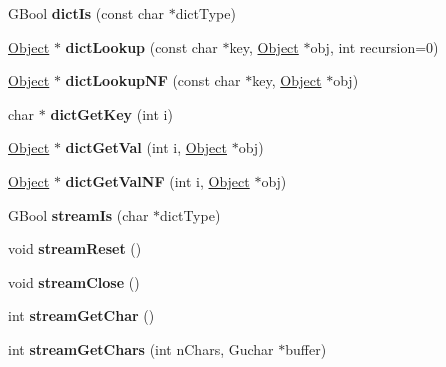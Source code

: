 \begin{DoxyCompactItemize}
G\+Bool {\bfseries dict\+Is} (const char $\ast$dict\+Type)
\item 
\mbox{\label{class_object_a0c5dc48b25274f878f384d1f009abd1d}} 
\hyperlink{class_object}{Object} $\ast$ {\bfseries dict\+Lookup} (const char $\ast$key, \hyperlink{class_object}{Object} $\ast$obj, int recursion=0)
\item 
\mbox{\label{class_object_adf819ae9b1ec29d9afbb25d9c6030c60}} 
\hyperlink{class_object}{Object} $\ast$ {\bfseries dict\+Lookup\+NF} (const char $\ast$key, \hyperlink{class_object}{Object} $\ast$obj)
\item 
\mbox{\label{class_object_ade6d8bea7f84f24589b9a2daa58199aa}} 
char $\ast$ {\bfseries dict\+Get\+Key} (int i)
\item 
\mbox{\label{class_object_aeae2062447decff3e0fb8b5daed06432}} 
\hyperlink{class_object}{Object} $\ast$ {\bfseries dict\+Get\+Val} (int i, \hyperlink{class_object}{Object} $\ast$obj)
\item 
\mbox{\label{class_object_af1578fd61fef3ad69c9c37a4e1b61448}} 
\hyperlink{class_object}{Object} $\ast$ {\bfseries dict\+Get\+Val\+NF} (int i, \hyperlink{class_object}{Object} $\ast$obj)
\item 
\mbox{\label{class_object_a849cc848172bdc67ea1453a59bcc8760}} 
G\+Bool {\bfseries stream\+Is} (char $\ast$dict\+Type)
\item 
\mbox{\label{class_object_ab3e47da09eaaff5bacd6d97509fd430b}} 
void {\bfseries stream\+Reset} ()
\item 
\mbox{\label{class_object_a43a35e42a059e48e77665b74cf311e15}} 
void {\bfseries stream\+Close} ()
\item 
\mbox{\label{class_object_ab9c31bcb5b59cfaca5b568aeb61088e0}} 
int {\bfseries stream\+Get\+Char} ()
\item 
\mbox{\label{class_object_a62a7da41d7d7c29e0893b09cb19a1729}} 
int {\bfseries stream\+Get\+Chars} (int n\+Chars, Guchar $\ast$buffer)
\item 

\end{DoxyCompactItemize}
